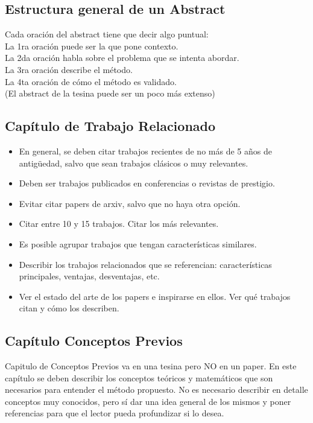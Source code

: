 \documentclass[a4paper,	11pt]{article}
\begin{document}
\subsection{Estructura general de un Abstract}
Cada oración del abstract tiene que decir algo puntual:\\
La 1ra oración puede ser la que pone contexto.\\
La 2da oración habla sobre el problema que se intenta abordar.\\
La 3ra oración describe el método.\\
La 4ta oración de cómo el método es validado.\\
(El abstract de la tesina puede ser un poco más extenso)

\subsection{Capítulo de Trabajo Relacionado}
\begin{itemize}
    \item En general, se deben citar trabajos recientes de no más de 5 años de antigüedad, salvo que sean trabajos clásicos o muy relevantes.
    \item Deben ser trabajos publicados en conferencias o revistas de prestigio.
    \item Evitar citar papers de arxiv, salvo que no haya otra opción.
    \item Citar entre 10 y 15 trabajos. Citar los más relevantes.
    \item Es posible agrupar trabajos que tengan características similares.
    \item Describir los trabajos relacionados que se referencian: características principales, ventajas, desventajas, etc.
    \item Ver el estado del arte de los papers e inspirarse en ellos. Ver qué trabajos citan y cómo los describen.
\end{itemize}
\subsection{Capítulo Conceptos Previos}
%
Capitulo de Conceptos Previos va en una tesina pero NO en un paper. En este capítulo se deben describir los conceptos teóricos y matemáticos que son necesarios para entender el método propuesto. No es necesario describir en detalle conceptos muy conocidos, pero sí dar una idea general de los mismos y poner referencias para que el lector pueda profundizar si lo desea.
\end{document}

